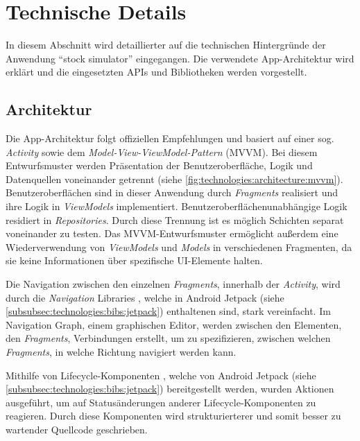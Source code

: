 \documentclass[a4paper]{article}
\begin{document}
\section{Technische Details}
\label{sec:technologies}
In diesem Abschnitt wird detaillierter auf die technischen Hintergründe der Anwendung "`stock simulator"' eingegangen. Die verwendete App-Architektur wird erklärt und die eingesetzten APIs und Bibliotheken werden vorgestellt.


\subsection{Architektur}
\label{subsec:technologies:architecture}
Die App-Architektur folgt offiziellen Empfehlungen \autocite{google_recommendations} und basiert auf einer sog. \textit{Activity} sowie dem \textit{Model-View-ViewModel-Pattern} (MVVM).
Bei diesem Entwurfsmuster werden Präsentation der Benutzeroberfläche, Logik und Datenquellen voneinander getrennt (siehe \autoref{fig:technologies:architecture:mvvm}).
Benutzeroberflächen sind in dieser Anwendung durch \textit{Fragments} realisiert und ihre Logik in \textit{ViewModels} implementiert.
Benutzeroberflächenunabhängige Logik residiert in \textit{Repositories}.
Durch diese Trennung ist es möglich Schichten separat voneinander zu testen.
Das MVVM-Entwurfsmuster ermöglicht außerdem eine Wiederverwendung von \textit{ViewModels} und \textit{Models} in verschiedenen Fragmenten, da sie keine Informationen über spezifische UI-Elemente halten.

Die Navigation zwischen den einzelnen \textit{Fragments}, innerhalb der \textit{Activity}, wird durch die \textit{Navigation} Libraries \autocite{android_navigation}, welche in Android Jetpack (siehe \autoref{subsubsec:technologies:bibs:jetpack}) enthaltenen sind, stark vereinfacht. Im Navigation Graph, einem graphischen Editor, werden zwischen den Elementen, den \textit{Fragments}, Verbindungen erstellt, um zu spezifizieren, zwischen welchen \textit{Fragments}, in welche Richtung navigiert werden kann.

Mithilfe von Lifecycle-Komponenten \autocite{android_lifecycle}, welche von Android Jetpack (siehe \autoref{subsubsec:technologies:bibs:jetpack}) bereitgestellt werden, wurden Aktionen ausgeführt, um auf Statusänderungen anderer Lifecycle-Komponenten zu reagieren. Durch diese Komponenten wird strukturierterer und somit besser zu wartender Quellcode geschrieben.
\end{document}
